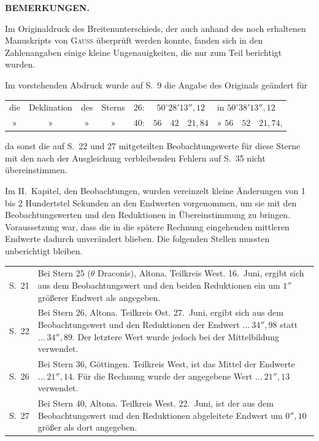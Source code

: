 \clearpage
\vspace*{14mm}
\begin{center}\textbf{BEMERKUNGEN.}\end{center}
{\small
Im Originaldruck des Breitenunterschieds, der auch anhand des noch erhaltenen Manuskripts von
\textsc{Gauss} überprüft werden konnte, fanden sich in den Zahlenangaben einige kleine
Ungenauigkeiten, die nur zum Teil berichtigt wurden.

Im vorstehenden Abdruck wurde auf S.\ 9 die Angabe des Originals geändert für
\begin{center}
\par\noindent\begin{tabular}{ccccccl}
die&Deklination&des&Sterns&26:&$50^\circ28'13''{,}12$&in $50^\circ38'13''{,}12$\\
»&»&»&»&40:&$56\quad42\quad21{,}84$&» $56\quad52\quad21{,}74$,
\end{tabular}
\end{center}
da sonst die auf S.\ 22 und 27 mitgeteilten Beobachtungswerte für diese Sterne mit den nach
der Ausgleichung verbleibenden Fehlern auf S.\ 35 nicht übereinstimmen.

Im II.\ Kapitel, den Beobachtungen, wurden vereinzelt kleine Änderungen von 1 bis 2 Hundertstel
Sekunden an den Endwerten vorgenommen, um sie mit den Beobachtungswerten und den Reduktionen
in Übereinstimmung zu bringen. Voraussetzung war, dass die in die spätere Rechnung eingehenden
mittleren Endwerte dadurch unverändert blieben. Die folgenden Stellen mussten unberichtigt bleiben.
\par\noindent\begin{tabular}{@{}p{.065\linewidth}p{.91\linewidth}@{}}
S.\ 21&Bei Stern 25 ($\theta$ Draconis), Altona. Teilkreis West. 16.\ Juni, ergibt sich aus dem
Beobachtungswert und den beiden Reduktionen ein um $1''$ größerer Endwert als angegeben.\\
S.\ 22&Bei Stern 26, Altona. Teilkreis Ost. 27.\ Juni, ergibt sich aus dem Beobachtungswert und den
Reduktionen der Endwert $\ldots\ 34''{,}98$ statt $\ldots\ 34''{,}89$. Der letztere Wert wurde
jedoch bei der Mittelbildung verwendet.\\
S.\ 26&Bei Stern 36, Göttingen. Teilkreis West, ist das Mittel der Endwerte $\ldots\ 21''{,}14$.
Für die Rechnung wurde der angegebene Wert $\ldots\ 21''{,}13$ verwendet.\\
S.\ 27&Bei Stern 40, Altona. Teilkreis West. 22.\ Juni, ist der aus dem Beobachtungswert und den
Reduktionen abgeleitete Endwert um $0''{,}10$ größer als dort angegeben.
\end{tabular}

}
